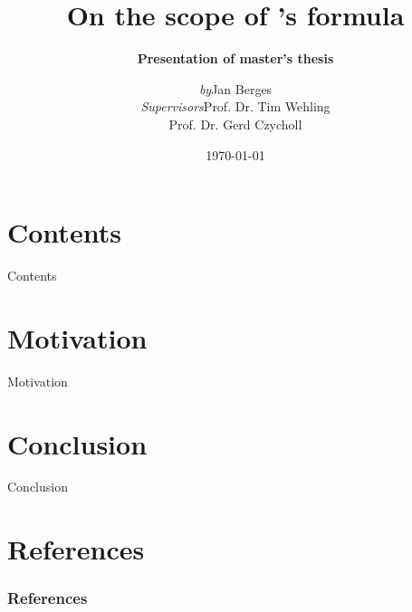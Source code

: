 \documentclass{beamer}
\title[%
    \hspace{-5mm} On the scope of \\
    \hspace{-5mm} \name{McMillan}'s formula%
    ]
    {On the scope of \name{McMillan}'s formula}
\subtitle{\medskip \bfseries \footnotesize Presentation of master's thesis}
\author[\hspace{-5mm} Jan Berges]{%
        \scriptsize
        \begin{tabular}{r l}
            \it by
                & Jan Berges \\[2mm]
            \it Supervisors
                & Prof. Dr. Tim Wehling \\
                & Prof. Dr. Gerd Czycholl
        \end{tabular}%
        }
\institute{%
    \raisebox{-0.5\height}{\texttt{[image: figures/uni.pdf]}} \quad
    \raisebox{-0.5\height}{\texttt{[image: figures/itp.pdf]}}%
    }
\date{\scriptsize \today}
\begin{document}
	\begin{frame}
		\titlepage
	\end{frame}

	\section*{Contents}

	\begin{frame}{Contents}
		\tableofcontents
	\end{frame}

	\section{Motivation}

	\begin{frame}{Motivation}
	\end{frame}

	\section{Conclusion}

	\begin{frame}{Conclusion}
	\end{frame}

	\section{References}

	\begin{frame}
		\frametitle{References}

        \printbibliography
	\end{frame}
\end{document}
